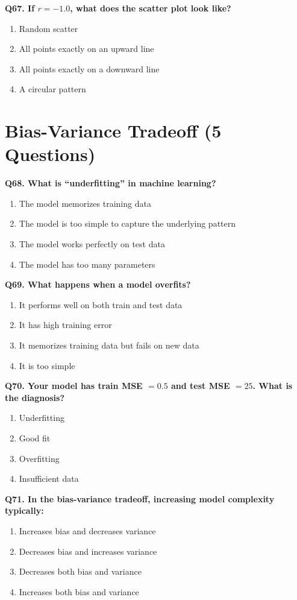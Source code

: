\documentclass[12pt, a4paper]{article}
\newcommand{\question}[1]{\vspace{0.6em}\noindent\textbf{#1}}
\begin{document}
\question{Q67. If $r = -1.0$, what does the scatter plot look like?}
\begin{enumerate}[label=\alph*)]
    \item Random scatter
    \item All points exactly on an upward line
    \item All points exactly on a downward line
    \item A circular pattern
\end{enumerate}

\section{Bias-Variance Tradeoff (5 Questions)}

\question{Q68. What is ``underfitting'' in machine learning?}
\begin{enumerate}[label=\alph*)]
    \item The model memorizes training data
    \item The model is too simple to capture the underlying pattern
    \item The model works perfectly on test data
    \item The model has too many parameters
\end{enumerate}

\question{Q69. What happens when a model overfits?}
\begin{enumerate}[label=\alph*)]
    \item It performs well on both train and test data
    \item It has high training error
    \item It memorizes training data but fails on new data
    \item It is too simple
\end{enumerate}

\question{Q70. Your model has train MSE $= 0.5$ and test MSE $= 25$. What is the diagnosis?}
\begin{enumerate}[label=\alph*)]
    \item Underfitting
    \item Good fit
    \item Overfitting
    \item Insufficient data
\end{enumerate}

\question{Q71. In the bias-variance tradeoff, increasing model complexity typically:}
\begin{enumerate}[label=\alph*)]
    \item Increases bias and decreases variance
    \item Decreases bias and increases variance
    \item Decreases both bias and variance
    \item Increases both bias and variance
\end{enumerate}
\end{document}
